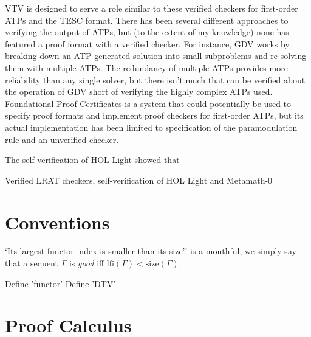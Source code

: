 \documentclass[12pt]{article}
\newcommand{\size}[0]{\mathrm{size}}
\newcommand{\lfi}[0]{\mathrm{lfi}}
\begin{document}
VTV is designed to serve a role similar to these verified checkers for first-order ATPs
and the TESC format.
There has been several different approaches to verifying the output of ATPs, but (to the
extent of my knowledge) none has featured a proof format with a verified checker. 
For instance, GDV \cite{} works by breaking down an ATP-generated solution into small 
subproblems and re-solving them with multiple ATPs. The redundancy of multiple ATPs 
provides more reliability than any single solver, but there isn't much that can be 
verified about the operation of GDV short of verifying the highly complex ATPs used.  
Foundational Proof Certificates \cite{} is a system that could potentially be used to 
specify proof formats and implement proof checkers for first-order ATPs, but its actual 
implementation has been limited to specification of the paramodulation rule and an 
unverified checker.



















The self-verification of HOL Light showed that 





 Verified LRAT checkers, self-verification of HOL Light and Metamath-0


\section{Conventions}



`Its largest functor index is smaller than its size'' is a mouthful, we 
simply say that a sequent $\Gamma$ is \textit{good} iff $\lfi(\Gamma) < \size(\Gamma)$.

Define 'functor'
Define 'DTV'

\section{Proof Calculus} \label{sec:format} 
\end{document}
